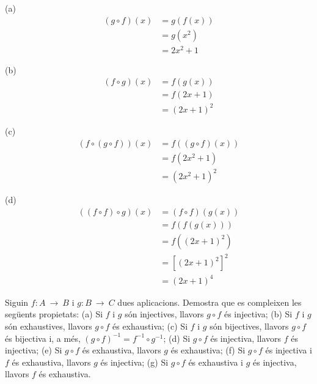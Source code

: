 \begin{solucio}
(a)
\begin{align*}
(g\circ f)(x)& =g\left( f(x)\right) \\
& =g(x^{2}) \\
& =2x^{2}+1
\end{align*}

(b)%
\begin{align*}
(f\circ g)(x)& =f\left( g(x)\right) \\
& =f(2x+1) \\
& =(2x+1)^{2}
\end{align*}

(c)%
\begin{align*}
\left( f\circ (g\circ f)\right) (x)& =f\left( (g\circ f)(x)\right) \\
& =f\left( 2x^{2}+1\right) \\
& =(2x^{2}+1)^{2}
\end{align*}

(d)%
\begin{align*}
\left( (f\circ f)\circ g\right) (x)& =(f\circ f)\left( g(x)\right) \\
& =f\left( f\left( g(x)\right) \right) \\
& =f\left( (2x+1)^{2}\right) \\
& =\left[ (2x+1)^{2}\right] ^{2} \\
& =(2x+1)^{4}
\end{align*}
\end{solucio}

\begin{exercici}
Siguin $f:A~\longrightarrow ~B$ i $g:B~\longrightarrow ~C$ dues aplicacions.
Demostra que es compleixen les següents propietats: (a) Si $f$ i $g$ són injectives, llavors $g\circ f$ és injectiva; (b) Si $f$ i $g$ són exhaustives, llavors $g\circ f$ és exhaustiva; (c) Si $f$ i $g$ són bijectives, llavors $g\circ f$ és bijectiva i, a més, $%
(g\circ f)^{-1}=f^{-1}\circ g^{-1}$; (d) Si $g\circ f$ és injectiva,
llavors $f$ és injectiva; (e) Si $g\circ f$ és exhaustiva, llavors 
$g$ és exhaustiva; (f) Si $g\circ f$ és injectiva i $f$ és
exhaustiva, llavors $g$ és injectiva; (g) Si $g\circ f$ és
exhaustiva i $g$ és injectiva, llavors $f$ és exhaustiva.
\end{exercici}

